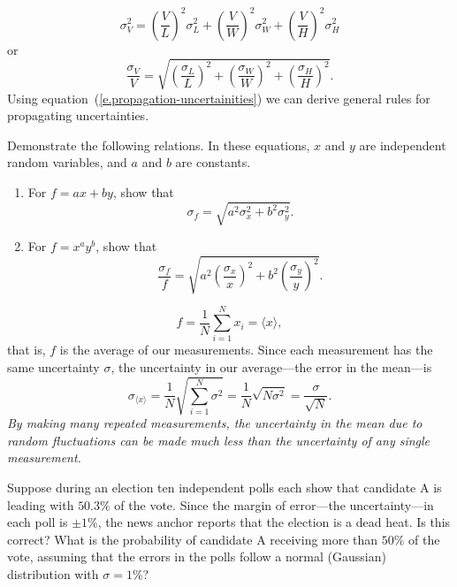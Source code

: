 \begin{equation}\label{e.uncertainty-volume}
	\sigma_{V}^{2} = \left(\frac{V}{L}\right)^{2}\sigma_{L}^{2}
		+ \left(\frac{V}{W}\right)^{2}\sigma_{W}^{2}
		+ \left(\frac{V}{H}\right)^{2}\sigma_{H}^{2}
\end{equation}
or
\[ \frac{\sigma_{V}}{V} = 
	\sqrt{\left(\frac{\sigma_{L}}{L}\right)^{2}
	+ \left(\frac{\sigma_{W}}{W}\right)^{2}
	+ \left(\frac{\sigma_{H}}{H}\right)^{2} }.
\]
Using equation~(\ref{e.propagation-uncertainities}) we can derive general rules for propagating uncertainties.

\begin{exercisebox}
Demonstrate the following relations.  In these equations, $x$ and $y$ are independent random variables, and $a$ and $b$ are constants.
\begin{enumerate}
\item For $f = ax + by$, show that 
\[ \sigma_{f} = \sqrt{ a^{2}\sigma_{x}^{2} + b^{2}\sigma_{y}^{2}}. \]
\item For $f = x^{a}y^{b}$, show that
\[ 
	\frac{\sigma_{f}}{f} = \sqrt{ a^{2}\left(\frac{\sigma_{x}}{x}\right)^{2} 
		+ b^{2}\left(\frac{\sigma_{y}}{y}\right)^{2} }.
\]
\end{enumerate}
\end{exercisebox}

\[ f = \frac{1}{N}\sum_{i=1}^{N}x_{i} = \langle x\rangle, \]
that is, $f$ is the average of our measurements.  Since each measurement has the same uncertainty $\sigma$, the uncertainty in our average---the error in the mean---is
\begin{equation}\label{e.error-mean}
 \sigma_{\langle x\rangle} = \frac{1}{N}\sqrt{\sum_{i=1}^{N}\sigma^{2}}
 	= \frac{1}{N}\sqrt{N\sigma^{2}}
  = \frac{\sigma}{\sqrt{N}}.
\end{equation}
\emph{By making many repeated measurements, the uncertainty in the mean due to random fluctuations can be made much less than the uncertainty of any single measurement.}

\begin{exercisebox}
Suppose during an election ten independent polls each show that candidate A is leading with $50.3\%$ of the vote. Since the margin of error---the uncertainty---in each poll is $\pm 1\%$, the news anchor reports that the election is a dead heat.  Is this correct?  What is the probability of candidate A receiving more than $50\%$ of the vote, assuming that the errors in the polls follow a normal (Gaussian) distribution with $\sigma = 1\%$?
\end{exercisebox}

